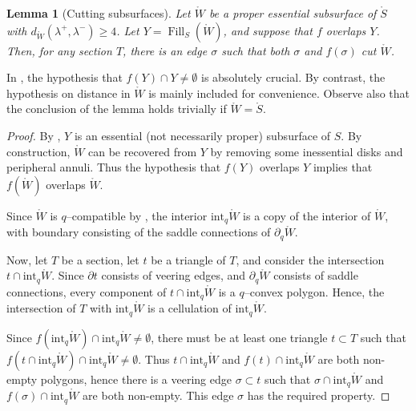 \documentclass[11pt,letterpaper]{amsart}
\newcommand{\stnote}[1]{\todo[color=blue!30,linecolor=blue!80!black,size= \footnotesize]{#1}}
\newcommand{\Fill}{\operatorname{Fill}}
\newcommand{\mr}{\mathring}
\newcommand{\bdy}{\partial} %
\newcommand{\psub}{\mr W}
\numberwithin{equation}{section}
\newtheorem{lemma}[theorem]{Lemma}
\theoremstyle{definition}
\renewcommand{\int}{\mathrm{int}}
\begin{document}
\begin{lemma}[Cutting subsurfaces]\label{Lem:CuttingSubsurfaces}
Let $\psub$ be a proper essential subsurface of $\mr S$ with $d_{\psub} (\lambda^+, \lambda^-) \geq 4$. 
Let $Y = \Fill_S(\psub)$, and suppose that $f$ overlaps $Y$. Then, for any section $T$, there is an edge $\sigma$ such that both $\sigma$ and $f(\sigma)$ cut $\psub$. 
\end{lemma}



In , the hypothesis that $f(Y) \cap Y \neq \emptyset$ is absolutely crucial. By contrast, the hypothesis on distance in $\psub$ is mainly included for convenience. Observe also that the conclusion of the lemma holds trivially if $\psub = \mr S$.

\begin{proof}
By , $Y$ is an essential (not necessarily proper) subsurface of $S$. 
By construction, $\psub$ can be recovered from $Y$ by removing some inessential disks and peripheral annuli. Thus the hypothesis that 
$f(Y)$ overlaps $Y$ implies that $f(\psub)$ overlaps $\psub$. 

Since $\psub $ is $q$--compatible by  , the interior $\int_q \psub $ is a copy of the interior of $\psub $, with boundary consisting of the saddle connections of $\partial_q \psub$. 

Now, let $T$ be a section, let $t$ be a triangle of $T$, and consider the intersection $t \cap \int_q \psub$. Since $\bdy t$ consists of veering edges, and $\bdy_q \psub $ consists of saddle connections, every component of $t \cap \int_q \psub$ is a $q$--convex polygon. Hence, the intersection of $T$ with $\int_q \psub$ is a cellulation of $\int_q \psub$.

Since $f(\int_q \psub) \cap \int_q \psub \neq \emptyset$, there must be at least one triangle $t \subset T$ such that $f(t \cap \int_q \psub) \cap \int_q \psub \neq \emptyset$. Thus $t \cap \int_q \psub$ and $f(t) \cap \int_q \psub$ are both non-empty polygons, hence there is a veering edge $\sigma \subset t$ such that $\sigma \cap \int_q \psub$ and $f(\sigma) \cap \int_q \psub$ are both non-empty. This edge $\sigma$ has the required property.
\end{proof}
\end{document}
